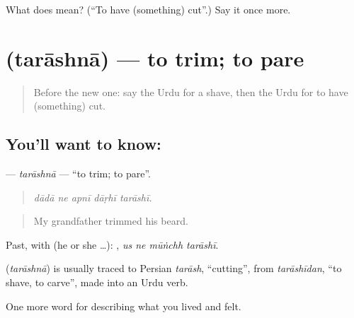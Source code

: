 \begin{tcolorbox}[breakable,colback=teal!4,colframe=teal!35!black,title={Before you move on}]
What does  mean? (\textquotedblleft{}To have (something) cut\textquotedblright{}.) Say it once more.
\end{tcolorbox}
\section[\texorpdfstring{\ur{تراشنا} (tarāshnā)}{تراشنا (tarāshnā)}]{ (tarāshnā) — to trim; to pare}

\label{lesson:UR-C482-tarashna}



\begin{quote}
Before the new one: say the Urdu for a shave, then the Urdu for to have (something) cut.
\end{quote}

\subsection*{You'll want to know: }
\textbf{} — \emph{tarāshnā} — \textquotedblleft{}to trim; to pare\textquotedblright{}.

\begin{quote}
    
\end{quote}

\begin{quote}
\emph{dādā ne apnī dāṛhī tarāshī.}
\end{quote}

\begin{quote}
My grandfather trimmed his beard.
\end{quote}

Past, with  (he or she …):    , \emph{us ne mūṅchh tarāshī}.

\begin{cousinweb}
\textbf{} (\emph{tarāshnā}) is usually traced to Persian \emph{tarāsh}, \textquotedblleft{}cutting\textquotedblright{}, from \emph{tarāshīdan}, \textquotedblleft{}to shave, to carve\textquotedblright{}, made into an Urdu verb.
\end{cousinweb}

\begin{grammarlens}[title={What you've built}]
One more word for describing what you lived and felt.
\end{grammarlens}

